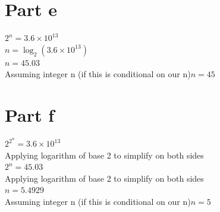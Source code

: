 \documentclass[]{article}
\begin{document}
\section{Part e}
$ 2^n = 3.6 \times 10^{13} $ \\
$ n = \log_2 (3.6 \times 10^{13}) $ \\
$ n = 45.03 $ \\
Assuming integer n (if this is conditional on our n)$ n = 45 $ 

\section{Part f}
$ 2^{2^n} = 3.6 \times 10^{13} $ \\
Applying logarithm of base 2 to simplify on both sides \\
$ 2^n = 45.03 $ \\
Applying logarithm of base 2 to simplify on both sides \\
$ n = 5.4929 $ \\
Assuming integer n (if this is conditional on our n)$ n = 5 $ 
\end{document}
